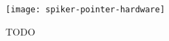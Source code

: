 \begin{figure}[t]
\begin{center}
\texttt{[image: spiker-pointer-hardware]}
\caption{
TODO
}
\label{fig:spiker_pointer_hardware}
\end{center}
\end{figure}

